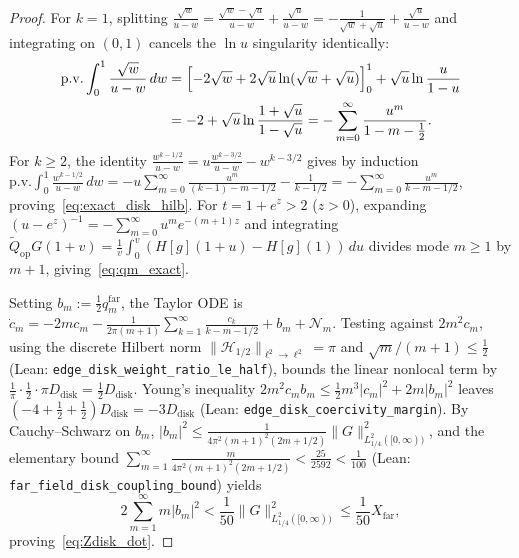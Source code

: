 \documentclass[11pt,a4paper]{article}
\begin{document}
\begin{proof}
For $k=1$, splitting $\frac{\sqrt{w}}{u-w}=\frac{\sqrt{w}-\sqrt{u}}{u-w}+\frac{\sqrt{u}}{u-w}=-\frac{1}{\sqrt{w}+\sqrt{u}}+\frac{\sqrt{u}}{u-w}$
and integrating on $(0,1)$ cancels the $\ln u$ singularity identically:
\begin{align*}
\mathrm{p.v.}\int_0^1\frac{\sqrt{w}}{u-w}\,dw
&= \Bigl[-2\sqrt{w}+2\sqrt{u}\ln(\sqrt{w}+\sqrt{u})\Bigr]_0^1 + \sqrt{u}\ln\frac{u}{1-u} \\
&= -2 + \sqrt{u}\ln\frac{1+\sqrt{u}}{1-\sqrt{u}}
= -\sum_{m=0}^\infty \frac{u^m}{1-m-\tfrac12}.
\end{align*}
For $k\ge 2$, the identity $\frac{w^{k-1/2}}{u-w}=u\frac{w^{k-3/2}}{u-w}-w^{k-3/2}$ gives by induction
$\mathrm{p.v.}\int_0^1\frac{w^{k-1/2}}{u-w}\,dw = -u\sum_{m=0}^\infty\frac{u^m}{(k-1)-m-1/2}-\frac{1}{k-1/2} = -\sum_{m=0}^\infty\frac{u^m}{k-m-1/2}$,
proving~\eqref{eq:exact_disk_hilb}.
For $t=1+e^z>2$ ($z>0$), expanding $(u-e^z)^{-1}=-\sum_{m=0}^\infty u^m e^{-(m+1)z}$ and
integrating $\widetilde{Q}_{\mathrm{op}}G(1+v)=\frac{1}{v}\int_0^v(H[g](1+u)-H[g](1))\,du$ divides mode $m\ge 1$ by $m+1$,
giving~\eqref{eq:qm_exact}.

Setting $b_m:=\tfrac12 q_m^{\mathrm{far}}$, the Taylor ODE is
$\dot{c}_m = -2m c_m - \frac{1}{2\pi(m+1)}\sum_{k=1}^\infty\frac{c_k}{k-m-1/2} + b_m + \mathcal{N}_m$.
Testing against $2m^2 c_m$, using the discrete Hilbert norm $\|\mathcal{H}_{1/2}\|_{\ell^2\to\ell^2}=\pi$ and
$\sqrt{m}/(m+1)\le\tfrac12$ (Lean: \texttt{edge\_disk\_weight\_\allowbreak ratio\_le\_half}), bounds the linear nonlocal term by
$\frac{1}{\pi}\cdot\frac{1}{2}\cdot\pi D_{\mathrm{disk}}=\frac{1}{2}D_{\mathrm{disk}}$.
Young's inequality $2m^2 c_m b_m\le\frac{1}{2}m^3|c_m|^2+2m|b_m|^2$ leaves $(-4+\frac{1}{2}+\frac{1}{2})D_{\mathrm{disk}}=-3 D_{\mathrm{disk}}$
(Lean: \texttt{edge\_disk\_coercivity\_margin}).
By Cauchy--Schwarz on $b_m$, $|b_m|^2\le \frac{1}{4\pi^2(m+1)^2(2m+1/2)}\|G\|_{L^2_{1/4}([0,\infty))}^2$, and
the elementary bound $\sum_{m=1}^\infty \frac{m}{4\pi^2(m+1)^2(2m+1/2)} < \frac{25}{2592} < \frac{1}{100}$
(Lean: \texttt{far\_field\_disk\_coupling\_bound}) yields
\[
2\sum_{m=1}^\infty m|b_m|^2 < \frac{1}{50}\|G\|_{L^2_{1/4}([0,\infty))}^2 \le \frac{1}{50}X_{\mathrm{far}},
\]
proving~\eqref{eq:Zdisk_dot}.
\end{proof}
\end{document}
